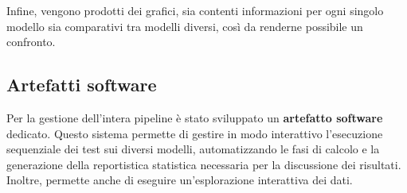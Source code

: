 \documentclass[../relazione.tex]{subfiles}
\begin{document}
Infine, vengono prodotti dei grafici, sia contenti informazioni per ogni singolo modello sia comparativi tra modelli diversi, così da renderne possibile un confronto.

\subsection{Artefatti software}
Per la gestione dell'intera pipeline è stato sviluppato un \textbf{artefatto software} dedicato. Questo sistema permette di gestire in modo interattivo l'esecuzione sequenziale dei test sui diversi modelli, automatizzando le fasi di calcolo e la generazione della reportistica statistica necessaria per la discussione dei risultati. Inoltre, permette anche di eseguire un'esplorazione interattiva dei dati.
\end{document}
